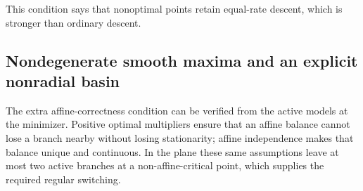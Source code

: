 This condition says that nonoptimal points retain equal-rate descent, which
is stronger than ordinary descent.

\subsection{Nondegenerate smooth maxima and an explicit nonradial basin}

The extra affine-correctness condition can be verified from the active
models at the minimizer. Positive optimal multipliers ensure that an affine
balance cannot lose a branch nearby without losing stationarity; affine
independence makes that balance unique and continuous. In the plane these
same assumptions leave at most two active branches at a non-affine-critical point,
which supplies the required regular switching.

